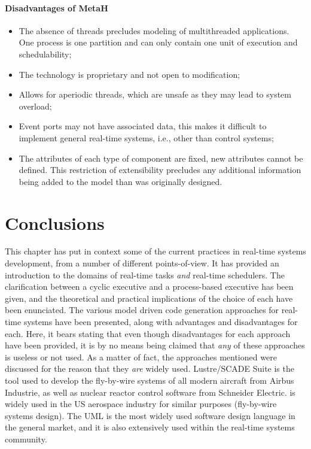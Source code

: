\paragraph{Disadvantages of MetaH}
\begin{itemize}
\item{The absence of threads precludes modeling of multithreaded
  applications. One process is one partition and can only contain one
  unit of execution and schedulability;}
\item{The technology is proprietary and not open to modification;}
\item{Allows for aperiodic threads, which are unsafe as they may lead
  to system overload;}
\item{Event ports may not have associated data, this makes it
  difficult to implement general real-time systems, i.e., other than
  control systems;}
\item{The attributes of each type of component are fixed, new
  attributes cannot be defined. This restriction of extensibility
  precludes any additional information being added to the model than
  was originally designed.}
\end{itemize}

\section{Conclusions}
This chapter has put in context some of the current practices in
real-time systems development, from a number of different
points-of-view. It has provided an introduction to the domains of
real-time tasks \emph{and} real-time schedulers. The clarification
between a cyclic executive and a process-based executive has been
given, and the theoretical and practical implications of the choice of
each have been enunciated. The various model driven code generation
approaches for real-time systems have been presented, along with
advantages and disadvantages for each. Here, it bears stating that
even though disadvantages for each approach have been provided, it is
by no means being claimed that \emph{any} of these approaches is
useless or not used. As a matter of fact, the approaches mentioned
were discussed for the reason that they \emph{are} widely
used. Lustre/SCADE Suite is the tool used to develop the fly-by-wire
systems of all modern aircraft from Airbus Industrie, as well as
nuclear reactor control software from Schneider Electric. \simu is
widely used in the US aerospace industry for similar purposes
(fly-by-wire systems design). The UML is the most widely used software
design language in the general market, and it is also extensively used
within the real-time systems community.

